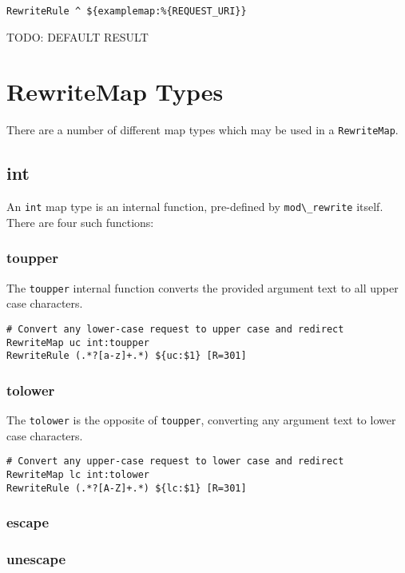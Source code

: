 \begin{verbatim}
RewriteRule ^ ${examplemap:%{REQUEST_URI}}
\end{verbatim}

TODO: DEFAULT RESULT

\section{RewriteMap Types}

There are a number of different map types which may be used in a \verb~RewriteMap~.

\subsection{int}
\label{rewritemap_int}

An \verb~int~ map type is an internal function, pre-defined by \verb~mod\_rewrite~ itself. There are four such functions:

\subsubsection{toupper}

The \verb~toupper~ internal function converts the provided argument text to all upper case characters.

\begin{verbatim}
# Convert any lower-case request to upper case and redirect
RewriteMap uc int:toupper
RewriteRule (.*?[a-z]+.*) ${uc:$1} [R=301]
\end{verbatim}

\subsubsection{tolower}

The \verb~tolower~ is the opposite of \verb~toupper~, converting any argument text to lower case characters.

\begin{verbatim}
# Convert any upper-case request to lower case and redirect
RewriteMap lc int:tolower
RewriteRule (.*?[A-Z]+.*) ${lc:$1} [R=301]
\end{verbatim}

\subsubsection{escape}
\subsubsection{unescape}

